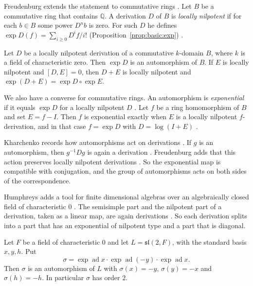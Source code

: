 Freudenburg extends the statement to commutative rings \cite[p.~12]{Freudenburg2017}. Let $B$ be a
commutative ring that contains $\mathbb{Q}$. A derivation $D$ of $B$ is
\emph{locally nilpotent} if for each $b \in B$ some power $D^n b$ is zero. For
such $D$ he defines $\exp D(f) = \sum_{i \ge 0} D^if/i!$ (Proposition~\ref{prop:basic:exp})
\cite[Section~1.1.9, p.~12]{Freudenburg2017}.\begin{proposition}\label{prop:basic:exp}
Let $D$ be a locally nilpotent derivation of a commutative $k$-domain $B$,
where $k$ is a field of characteristic zero. Then $\exp D$ is an automorphism of
$B$. If $E$ is locally nilpotent and $[D,E] = 0$, then $D+E$ is locally
nilpotent and $\exp(D+E) = \exp D \circ \exp E$.
\end{proposition}

We also have a converse for commutative rings. An automorphism is \emph{exponential} if it equals
$\exp D$ for a locally nilpotent $D$ \cite[Section~2.10, p.~66]{Freudenburg2017}. Let $f$ be a ring homomorphism of $B$ and
set $E = f - I$. Then $f$ is exponential exactly when $E$ is a locally nilpotent
$f$-derivation, and in that case $f = \exp D$ with $D = \log(I+E)$
\cite[Proposition~2.57, p.~67]{Freudenburg2017}.

Kharchenko records how automorphisms act on derivations \cite[p.~11]{Kharchenko1991}. If $g$ is an
automorphism, then $g^{-1}Dg$ is again a derivation \cite[p.~11]{Kharchenko1991}.
Freudenburg adds that this action preserves locally nilpotent derivations
\cite[Principle~1(d), p.~21]{Freudenburg2017}. So the exponential map is
compatible with conjugation, and the group of automorphisms acts on both sides
of the correspondence.

Humphreys adds a tool for finite dimensional algebras over an algebraically
closed field of characteristic $0$ \cite[\S4.2, Lemma~B]{Humphreys1972}. The semisimple part and the nilpotent part
of a derivation, taken as a linear map, are again derivations
\cite[\S4.2, Lemma~B]{Humphreys1972}. So each derivation splits into a part
that has an exponential of nilpotent type and a part that is diagonal.

\begin{example}\label{ex:basic:sl2}
Let $F$ be a field of characteristic $0$ and let $L=\mathfrak{sl}(2,F)$, with the
standard basis $x,y,h$. Put
\[
\sigma=\exp\operatorname{ad}x\cdot\exp\operatorname{ad}(-y)\cdot\exp\operatorname{ad}x .
\]
Then $\sigma$ is an automorphism of $L$ with $\sigma(x)=-y$, $\sigma(y)=-x$ and
$\sigma(h)=-h$. In particular $\sigma$ has order $2$.
\end{example}

